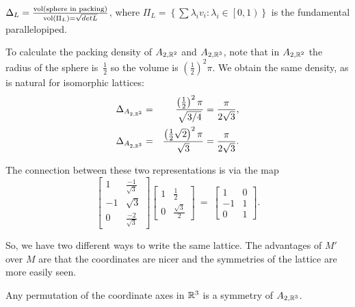 \begin{definition}
  $\Delta_L=\frac{\operatorname{vol}(\text{sphere in packing})}{\operatorname{vol}(\Pi_L)=\sqrt{detL}}$,
  where $\Pi_L=\left\{\sum\lambda_i v_i : \lambda_i\in\left[0,1\right)\right\}$ is the
  fundamental parallelopiped.
\end{definition}

To calculate the packing density of $A_{2,\mathbb{R}^{2}}$ and $A_{2,\mathbb{R}^{3}}$, note that in
$A_{2,\mathbb{R}^{2}}$ the radius of the sphere is~$\frac{1}{2}$ so the volume is
$\left(\frac{1}{2}\right)^{2}\pi$. We obtain the same density, as is natural for
isomorphic lattices:
\begin{eqnarray*}
  \Delta_{A_{2,\mathbb{R}^{2}}}
 &=&
  \frac{\left(\frac{1}{2}\right)^{2}\pi}{\sqrt{3/4}}=\frac{\pi}{2\sqrt{3}},
 \\
  \Delta_{A_{2,\mathbb{R}^{3}}}
 &=&
  \frac{\left(\frac{1}{2}\sqrt{2}\right)^{2}\pi}{\sqrt{3}}=\frac{\pi}{2\sqrt{3}}.
\end{eqnarray*}

The connection between these two representations is via the map
\[
 \begin{bmatrix}
1 & \frac{-1}{\sqrt{3}} \\
-1 & \sqrt{3} \\
0 & \frac{-2}{\sqrt{3}}\end{bmatrix}
\begin{bmatrix}
1 & \frac{1}{2} \\
0 & \frac{\sqrt{3}}{2}
\end{bmatrix}
\ = \
\begin{bmatrix}
1 & 0 \\
-1 & 1 \\
0 & 1\end{bmatrix}.
\]

So, we have two different ways to write the same lattice. The advantages of $M'$ over $M$
are that the coordinates are nicer and the symmetries of the lattice are more easily seen.


\begin{claim}
Any permutation of the coordinate axes in $\mathbb{R}^{3}$ is a symmetry of $A_{2,\mathbb{R}^{3}}$.
\end{claim}


